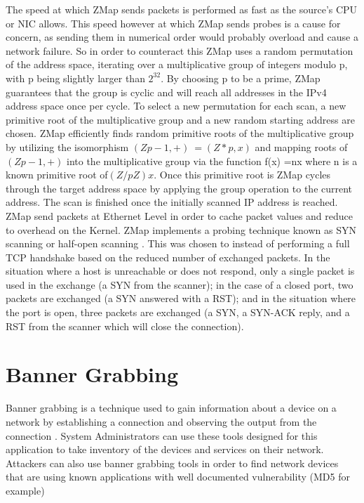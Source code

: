 \documentclass[a4wide,leqno,12pt]{report}
\begin{document}
The speed at which ZMap sends packets is performed as fast as the source's CPU or NIC allows. This speed however at which ZMap sends probes is a cause for concern, as sending them in numerical order would probably overload and cause a network failure. So in order to counteract this ZMap uses a random permutation of the address space, iterating over a multiplicative group of integers modulo p, with p being slightly larger than $2^{32}$. By choosing p to be a prime, ZMap guarantees that the group is cyclic and
will reach all addresses in the IPv4 address space once per cycle. To select a new permutation for each scan, a new primitive root of the multiplicative group and a new random starting address are chosen. ZMap efficiently finds random primitive roots of
the  multiplicative  group  by  utilizing  the  isomorphism $(Zp - 1,+)~=(Z*p,x)$ and  mapping  roots of$(Zp-1,+)$ into the multiplicative group via the  function f(x) =nx where n is a known primitive root of$(Z/pZ)x$. Once this primitive root is ZMap cycles through the target address space by applying the group operation to the current address. The scan is finished once the initially scanned IP address is reached\cite{durumeric2013zmap}.\\

ZMap send packets at Ethernet Level in order to cache packet values and reduce to overhead on the Kernel.
ZMap implements a probing technique known as
SYN scanning or half-open scanning \cite{durumeric2013zmap}. This was chosen to instead of performing a full TCP handshake
based on the reduced number of exchanged packets.  In
the situation where a host is unreachable or does
not respond, only a single packet is used in the exchange (a SYN from
the scanner); in the case of a closed port, two packets
are exchanged (a SYN answered with a RST); and in the
situation where the port is open, three packets are
exchanged (a SYN, a SYN-ACK reply, and a RST from
the scanner which will close the connection)\cite{durumeric2013zmap}.


\section{Banner Grabbing}
Banner grabbing is a technique used to gain information about a device on a network by establishing a connection and observing the output from the connection \cite{kondo2014penetration}. System Administrators can use these tools designed for this application to take inventory of the devices and services on their network. Attackers can also use banner grabbing tools in order to find network devices that are using known applications with well documented vulnerability (MD5 for example)
\end{document}
